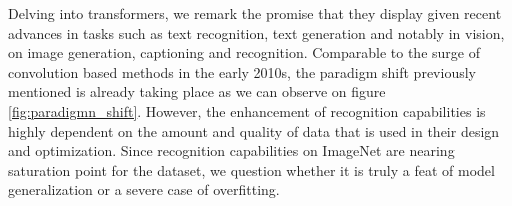 \noindent Delving into transformers, we remark the promise that they display 
given recent advances in tasks such as text recognition, text generation and notably in vision, 
on image generation, captioning and recognition. Comparable to the surge of convolution 
based methods in the early 2010s, the paradigm shift previously mentioned is already taking place as 
we can observe on figure \autoref{fig:paradigmn_shift}. However, the enhancement of recognition 
capabilities is highly dependent on the amount and quality of data that is used in their 
design and optimization. Since recognition capabilities on ImageNet are nearing saturation point 
for the dataset, we question whether it is truly a feat of model generalization or a severe case 
of overfitting.

